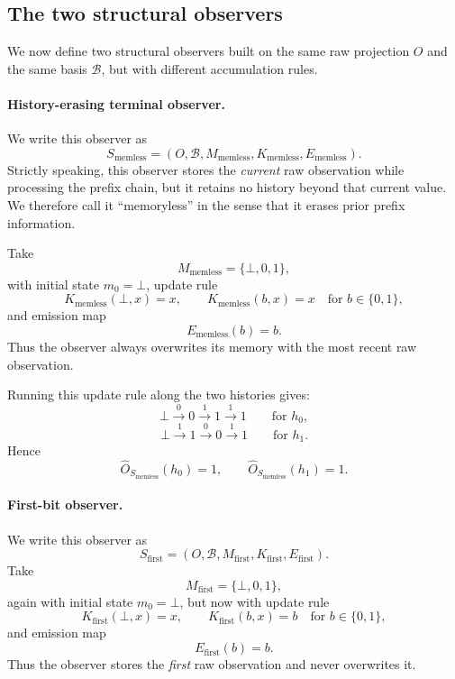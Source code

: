 \documentclass[11pt,twoside]{article}
\theoremstyle{definition}
\begin{document}
\subsection{The two structural observers}
\label{app:memory-observers}

We now define two structural observers built on the same raw projection \(O\) and the same basis \(\mathcal{B}\), but with different accumulation rules.

\paragraph{History-erasing terminal observer.}
We write this observer as
\[
  S_{\mathrm{memless}}
  =
  (O,\mathcal{B},M_{\mathrm{memless}},K_{\mathrm{memless}},E_{\mathrm{memless}}).
\]
Strictly speaking, this observer stores the \emph{current} raw observation while processing the prefix chain, but it retains no history beyond that current value. We therefore call it ``memoryless'' in the sense that it erases prior prefix information.

Take
\[
  M_{\mathrm{memless}} = \{\bot,0,1\},
\]
with initial state \(m_0=\bot\), update rule
\[
  K_{\mathrm{memless}}(\bot,x)=x,
  \qquad
  K_{\mathrm{memless}}(b,x)=x
  \quad
  \text{for } b\in\{0,1\},
\]
and emission map
\[
  E_{\mathrm{memless}}(b)=b.
\]
Thus the observer always overwrites its memory with the most recent raw observation.

Running this update rule along the two histories gives:
\[
  \bot \xrightarrow{0} 0 \xrightarrow{1} 1 \xrightarrow{1} 1
  \qquad \text{for } h_0,
\]
\[
  \bot \xrightarrow{1} 1 \xrightarrow{0} 0 \xrightarrow{1} 1
  \qquad \text{for } h_1.
\]
Hence
\[
  \widehat{O}_{S_{\mathrm{memless}}}(h_0)=1,
  \qquad
  \widehat{O}_{S_{\mathrm{memless}}}(h_1)=1.
\]

\paragraph{First-bit observer.}
We write this observer as
\[
  S_{\mathrm{first}}
  =
  (O,\mathcal{B},M_{\mathrm{first}},K_{\mathrm{first}},E_{\mathrm{first}}).
\]
Take
\[
  M_{\mathrm{first}} = \{\bot,0,1\},
\]
again with initial state \(m_0=\bot\), but now with update rule
\[
  K_{\mathrm{first}}(\bot,x)=x,
  \qquad
  K_{\mathrm{first}}(b,x)=b
  \quad
  \text{for } b\in\{0,1\},
\]
and emission map
\[
  E_{\mathrm{first}}(b)=b.
\]
Thus the observer stores the \emph{first} raw observation and never overwrites it.
\end{document}

